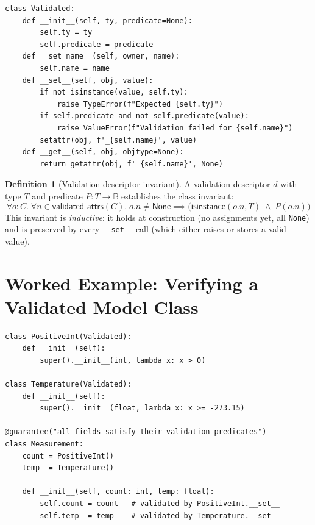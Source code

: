 \documentclass[11pt,a4paper]{report}
\theoremstyle{definition}
\newtheorem{definition}{Definition}[chapter]
\theoremstyle{plain}
\newcommand{\Bool}{\mathbb{B}}
\begin{document}
\begin{lstlisting}[style=python]
class Validated:
    def __init__(self, ty, predicate=None):
        self.ty = ty
        self.predicate = predicate
    def __set_name__(self, owner, name):
        self.name = name
    def __set__(self, obj, value):
        if not isinstance(value, self.ty):
            raise TypeError(f"Expected {self.ty}")
        if self.predicate and not self.predicate(value):
            raise ValueError(f"Validation failed for {self.name}")
        setattr(obj, f'_{self.name}', value)
    def __get__(self, obj, objtype=None):
        return getattr(obj, f'_{self.name}', None)
\end{lstlisting}

\begin{definition}[Validation descriptor invariant]
A validation descriptor $d$ with type $T$ and predicate $P : T \to \Bool$
establishes the class invariant:
\[
  \forall o : C.\; \forall n \in \mathsf{validated\_attrs}(C).\;
  o.n \neq \mathsf{None} \implies
  \bigl(\mathsf{isinstance}(o.n, T) \;\wedge\; P(o.n)\bigr)
\]
This invariant is \emph{inductive}: it holds at construction (no assignments
yet, all \texttt{None}) and is preserved by every \texttt{\_\_set\_\_} call
(which either raises or stores a valid value).
\end{definition}

\section{Worked Example: Verifying a Validated Model Class}

\begin{lstlisting}[style=synhopy]
class PositiveInt(Validated):
    def __init__(self):
        super().__init__(int, lambda x: x > 0)

class Temperature(Validated):
    def __init__(self):
        super().__init__(float, lambda x: x >= -273.15)

@guarantee("all fields satisfy their validation predicates")
class Measurement:
    count = PositiveInt()
    temp  = Temperature()

    def __init__(self, count: int, temp: float):
        self.count = count   # validated by PositiveInt.__set__
        self.temp  = temp    # validated by Temperature.__set__
\end{lstlisting}
\end{document}
